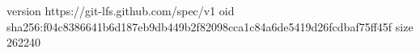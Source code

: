 version https://git-lfs.github.com/spec/v1
oid sha256:f04c8386641b6d187eb9db449b2f82098cca1c84a6de5419d26fcdbaf75ff45f
size 262240
